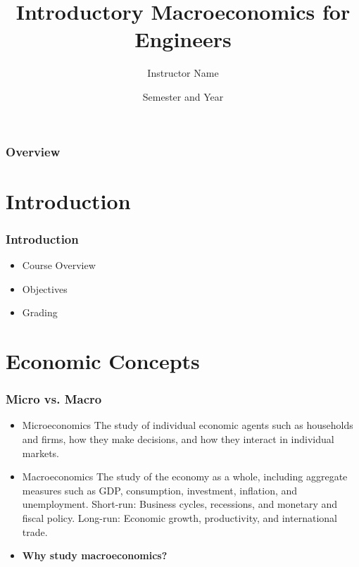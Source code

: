 \documentclass{beamer}
\title{Introductory Macroeconomics for Engineers}
\author{Instructor Name}
\date{Semester and Year}
\begin{document}
\begin{frame}
\titlepage
\end{frame}

\begin{frame}
\frametitle{Overview}
\tableofcontents
\end{frame}

\section{Introduction}
\begin{frame}
\frametitle{Introduction}
\begin{itemize}
    \item Course Overview
    \item Objectives
    \item Grading
\end{itemize}
\end{frame}

\section{Economic Concepts}
\begin{frame}
\frametitle{Micro vs. Macro}
\begin{itemize}
    \item Microeconomics
    The study of individual economic agents such as households and firms,
    how they make decisions, and how they interact in individual markets.
    \pause
    \item Macroeconomics
    The study of the economy as a whole, including aggregate measures such as
    GDP, consumption, investment, inflation, and unemployment.
    Short-run: Business cycles, recessions, and monetary and fiscal policy.
    Long-run: Economic growth, productivity, and international trade. \pause
    \item \textbf{Why study macroeconomics?}
\end{itemize}
\end{frame}
\end{document}
